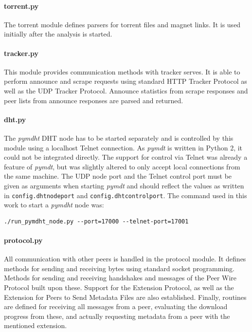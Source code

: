 \documentclass[10pt, a4paper, twoside, headsepline]{scrbook}
\renewcommand{\_}{\origunderscore\allowbreak}
\newcommand{\config}[1]{\texttt{config.\allowbreak #1}}
\begin{document}
\paragraph{torrent.py} The torrent module defines parsers for torrent files and magnet links. It is used initially after the analysis is started.

\paragraph{tracker.py} This module provides communication methods with tracker serves. It is able to perform announce and scrape requests using standard HTTP Tracker Protocol as well as the UDP Tracker Protocol. Announce statistics from scrape responses and peer lists from announce responses are parsed and returned.

\paragraph{dht.py} The \emph{pymdht} DHT node has to be started separately and is controlled by this module using a localhost Telnet connection. As \emph{pymdt} is written in Python 2, it could not be integrated directly. The support for control via Telnet was already a feature of \emph{pymdt}, but was slightly altered to only accept local connections from the same machine. The UDP node port and the Telnet control port must be given as arguments when starting \emph{pymdt} and should reflect the values as written in \config{dht\_node\_port} and \config{dht\_control\_port}. The command used in this work to start a \emph{pymdht} node was:
\begin{lstlisting}
./run_pymdht_node.py --port=17000 --telnet-port=17001
\end{lstlisting}

\paragraph{protocol.py} All communication with other peers is handled in the protocol module. It defines methods for sending and receiving bytes using standard socket programming. Methods for sending and receiving handshakes and messages of the Peer Wire Protocol built upon these. Support for the Extension Protocol, as well as the Extension for Peers to Send Metadata Files are also established. Finally, routines are defined for receiving all messages from a peer, evaluating the download progress from these, and actually requesting metadata from a peer with the mentioned extension.
\end{document}
